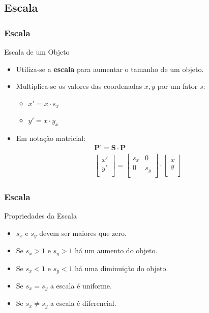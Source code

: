 \documentclass{beamer}
\begin{document}
\subsection{Escala}
\begin{frame}
\frametitle{Escala}


	\begin{block}{Escala de um Objeto}
		\begin{itemize}
			\item Utiliza-se a \textbf{escala} para aumentar o tamanho de um objeto.
			\item Multiplica-se os valores das coordenadas $x,y$ por um fator $s$:\\
				\begin{itemize}
					\item $x' = x \cdot s_x$
					\item $y' = x \cdot y_x$
				\end{itemize}
			\item Em notação matricial:\\
					\begin{eqnarray*}
							\textbf{P'} = \textbf{S} \cdot \textbf{P}  \\
							\begin{bmatrix} 
								x' \\
								y' \\
							\end{bmatrix}
							=	\begin{bmatrix}
								s_x & 0 \\
								0 & s_y\\
							\end{bmatrix}
							\cdot \begin{bmatrix}
								x \\
								y \\
							\end{bmatrix}
						\end{eqnarray*}
		\end{itemize}
	\end{block}
	
\end{frame}

\begin{frame}
\frametitle{Escala}


	\begin{block}{Propriedades da Escala}
		\begin{itemize}
			\item<1-> $s_x$ e $s_y$ devem ser maiores que zero.
			\item<2-> Se $s_x > 1$ e $s_y > 1$ há um aumento do objeto.
			\item<3-> Se $s_x < 1$ e $s_y < 1$ há uma diminuição do objeto.
			\item<4-> Se $s_x  = s_y$ a escala é uniforme.
			\item<5-> Se $s_x  \neq s_y$ a escala é diferencial.
		\end{itemize}
	\end{block}
	
\end{frame}
\end{document}
